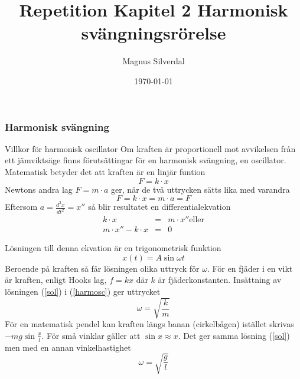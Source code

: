\documentclass[11pt]{beamer}
\title{Repetition Kapitel 2 Harmonisk svängningsrörelse}
\author{Magnus Silverdal}
\institute{NTI Gymnasiet}
\date{\today}
\begin{document}
    \frame{\titlepage}

    \begin{frame}
        \frametitle{Harmonisk svängning}

        \begin{block}{Villkor för harmonisk oscillator}
            Om kraften är proportionell mot avvikelsen från ett jämviktsäge finns förutsättingar för en harmonisk
            svängning, en oscillator. Matematisk betyder det att kraften är en linjär funtion
            \begin{equation}
                F = k \cdot x
            \end{equation}
            Newtons andra lag $ F = m \cdot a$ ger, när de två uttrycken sätts lika med varandra
            \begin{equation}
                F = k \cdot x = m \cdot a = F
            \end{equation}
            Eftersom $a = \frac{d^2 x}{dt^2} = x''$ så blir resultatet en differentialekvation
            \begin{eqnarray}
                k \cdot x &=& m \cdot x'' \text{eller} \\
                m \cdot x'' - k \cdot x &=& 0 \label{harmosc}
            \end{eqnarray}
        \end{block}
    \end{frame}
    \begin{frame}
        \begin{block}{}
            Lösningen till denna ekvation är en trigonometrisk funktion
            \begin{equation}
                x(t) = A \sin{\omega t} \label{sol}
            \end{equation}
            Beroende på kraften så får lösningen olika uttryck för $\omega$. För en fjäder i en vikt är kraften, enligt
            Hooks lag, $f = k x$ där $k$ är fjäderkonstanten. Insättning av lösningen (\ref{sol}) i (\ref{harmosc}) ger uttrycket
            \begin{equation}
                \omega = \sqrt{\frac{k}{m}}
            \end{equation}
            För en matematisk pendel kan kraften längs banan (cirkelbågen) istället skrivas $- m g \sin{\frac{x}{l}}$. För små vinklar
            gäller att $\sin{x} \approx x$. Det ger samma lösning (\ref{sol}) men med en annan vinkelhastighet
            \begin{equation}
                \omega = \sqrt{\frac{g}{l}}
            \end{equation}
        \end{block}
    \end{frame}
\end{document}
